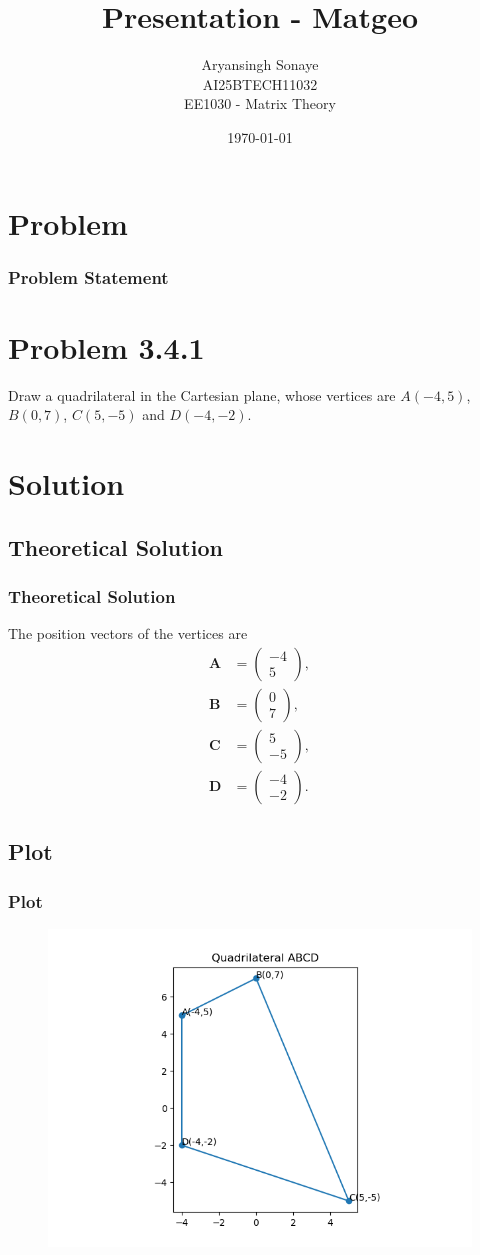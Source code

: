 \documentclass{beamer}
\title{Presentation - Matgeo}
\author{Aryansingh Sonaye \\
AI25BTECH11032 \\
EE1030 - Matrix Theory}
\date{\today}
\theoremstyle{remark}
\newcommand{\myvec}[1]{\ensuremath{\begin{pmatrix}#1\end{pmatrix}}}
\let\vec\mathbf
\numberwithin{equation}{section}
\begin{document}
\begin{frame}
\titlepage
\end{frame}

\section{Problem}
\begin{frame}
\frametitle{Problem Statement}
\section*{Problem 3.4.1}
Draw a quadrilateral in the Cartesian plane, whose vertices are
$A(-4,5)$, $B(0,7)$, $C(5,-5)$ and $D(-4,-2)$.
\end{frame}

\section{Solution}

\subsection{Theoretical Solution }
\begin{frame}
\frametitle{Theoretical Solution}
The position vectors of the vertices are
\begin{align}
\vec{A} &= \myvec{-4\\5}, \\
\vec{B} &= \myvec{0\\7}, \\
\vec{C} &= \myvec{5\\-5}, \\
\vec{D} &= \myvec{-4\\-2}.
\end{align}
\end{frame}


\subsection{Plot}
\begin{frame}
    \frametitle{Plot}
\begin{figure}[H]
   \centering
   \includegraphics[width=0.9\columnwidth]{figs/quad_only.png}
   \caption{}
   \label{}
   \end{figure}
\end{frame}
\end{document}
